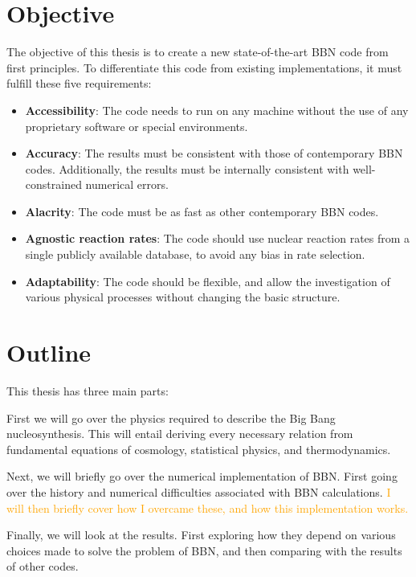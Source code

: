 \section{Objective} 
The objective of this thesis is to create a new state-of-the-art BBN code from first principles. To differentiate this code from existing implementations, it must fulfill these five requirements:

\begin{itemize}
    \item \textbf{Accessibility}: The code needs to run on any machine without the use of any proprietary software or special environments. %
    \item \textbf{Accuracy}: The results must be consistent with those of contemporary BBN codes. Additionally, the results must be internally consistent with well-constrained numerical errors. 
    \item \textbf{Alacrity}: The code must be as fast as other contemporary BBN codes.
    \item \textbf{Agnostic reaction rates}: The code should use nuclear reaction rates from a single publicly available database, to avoid any bias in rate selection.
    \item \textbf{Adaptability}: The code should be flexible, and allow the investigation of various physical processes without changing the basic structure.
\end{itemize}

\section{Outline}

This thesis has three main parts:

\noindent First we will go over the physics required to describe the Big Bang nucleosynthesis. This will entail deriving every necessary relation from fundamental equations of cosmology, statistical physics, and thermodynamics. 

\noindent Next, we will briefly go over the numerical implementation of BBN. First going over the history and numerical difficulties associated with BBN calculations. \textcolor{orange}{I will then briefly cover how I overcame these, and how this implementation works.}

\noindent Finally, we will look at the results. First exploring how they depend on various choices made to solve the problem of BBN, and then comparing with the results of other codes.



